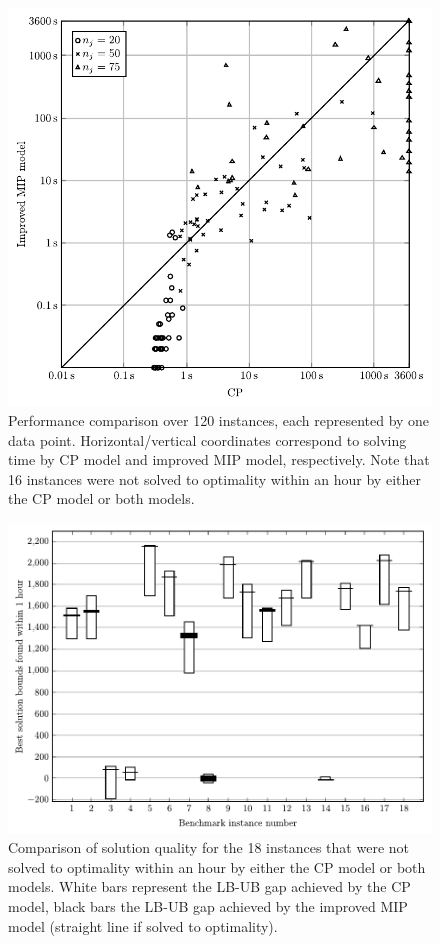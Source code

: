 \documentclass[oribibl]{llncs}
\begin{document}
\begin{figure}[h]
\centering
\includegraphics[height=0.55\textheight]{scattercomp.pdf}
\caption{Performance comparison over 120 instances, each represented by one data
point. Horizontal/vertical coordinates correspond to solving time by CP model
and improved MIP model, respectively. Note that 16 instances were not solved to
optimality within an hour by either the CP model or both models.}
\label{fig:scattercomp}
\end{figure}

\begin{figure}[h]
\centering
\includegraphics[height=0.45\textheight]{gapcomp.pdf}
\caption{Comparison of solution quality for the 18 instances that were not
solved to optimality within an hour by either the CP model or both models. White bars represent
the LB-UB gap achieved by the CP model, black bars the LB-UB gap achieved by the
improved MIP model (straight line if solved to optimality).}
\label{fig:gapcomp}
\end{figure}
\end{document}
